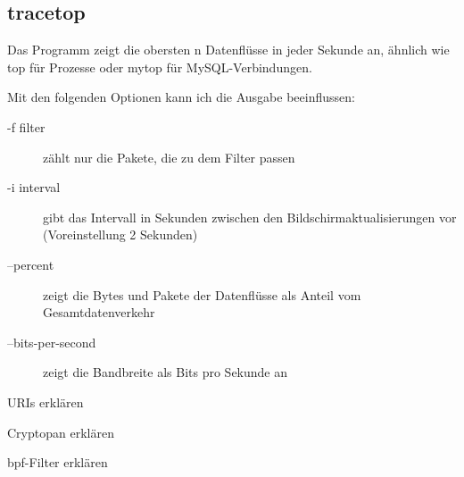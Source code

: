 \begin{normaltext}
  \subsection*{tracetop}
  Das Programm zeigt die obersten n Datenflüsse in jeder Sekunde an, ähnlich
  wie top für Prozesse oder mytop für MySQL-Verbindungen.

  Mit den folgenden Optionen kann ich die Ausgabe beeinflussen:
  \begin{description}
    \item[-f filter] zählt nur die Pakete, die zu dem Filter passen
    \item[-i interval] gibt das Intervall in Sekunden zwischen den
      Bildschirmaktualisierungen vor (Voreinstellung 2 Sekunden)
    \item[--percent] zeigt die Bytes und Pakete der Datenflüsse als Anteil vom
      Gesamtdatenverkehr
    \item[--bits-per-second] zeigt die Bandbreite als Bits pro Sekunde an
  \end{description}
\end{normaltext}
\begin{notes}
\item URIs erklären
\item Cryptopan erklären
\item bpf-Filter erklären
\end{notes}


